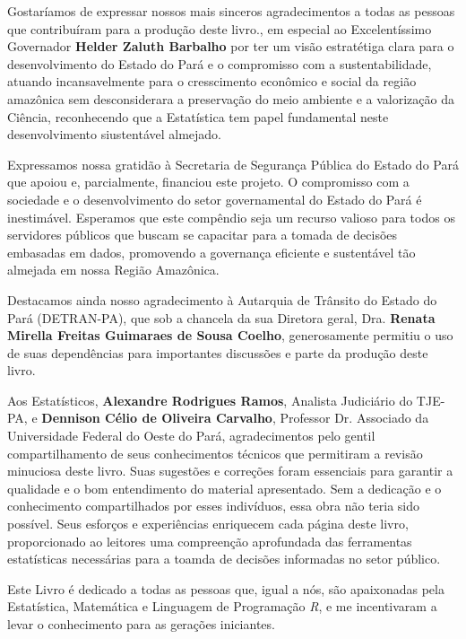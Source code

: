 \begin{refsection}


Gostaríamos de expressar nossos mais sinceros agradecimentos a todas as pessoas que contribuíram para a produção deste livro., em especial ao Excelentíssimo Governador \textbf{Helder Zaluth Barbalho} por ter um visão estratétiga clara para o desenvolvimento do Estado do Pará e o compromisso com a sustentabilidade, atuando incansavelmente para o cresscimento econômico e social da região amazônica sem desconsiderara a preservação do meio ambiente e a valorização da Ciência, reconhecendo que a Estatística tem papel fundamental neste desenvolvimento siustentável almejado.\vst

Expressamos nossa gratidão à Secretaria de Segurança Pública do Estado do Pará que apoiou e, parcialmente, financiou este projeto. O compromisso com a sociedade e o desenvolvimento do setor governamental do Estado do Pará é inestimável. Esperamos que este compêndio seja um recurso valioso para todos os servidores públicos que buscam se capacitar para a tomada de decisões embasadas em dados, promovendo a governança eficiente e sustentável tão almejada em nossa Região Amazônica.\vst

Destacamos ainda nosso agradecimento à Autarquia de Trânsito do Estado do Pará (DETRAN-PA), que sob a chancela da sua Diretora geral, Dra. \textbf{Renata Mirella Freitas Guimaraes de Sousa Coelho}, generosamente permitiu o uso de suas dependências para importantes discussões e parte da produção deste livro.
\vst

Aos Estatísticos, \textbf{Alexandre Rodrigues Ramos}, Analista Judiciário do TJE-PA, e \textbf{Dennison Célio de Oliveira Carvalho}, Professor Dr. Associado da Universidade Federal do Oeste do Pará, agradecimentos pelo gentil compartilhamento de seus conhecimentos técnicos que permitiram a revisão minuciosa deste livro. Suas sugestões e correções foram essenciais para garantir a qualidade e o bom entendimento do material apresentado. Sem a dedicação e o conhecimento compartilhados por esses indivíduos, essa obra não teria sido possível. Seus esforços e experiências enriquecem cada página deste livro, proporcionado ao leitores uma compreenção aprofundada das ferramentas estatísticas necessárias para a toamda de decisões informadas no setor público.

\newpage

Este Livro é dedicado a todas as pessoas que, igual a nós, são apaixonadas pela Estatística, Matemática e Linguagem de Programação \textit{R}, e me incentivaram a levar o conhecimento para as gerações iniciantes.
\vst







\printbibliography[heading=subbibliography]
\end{refsection}






